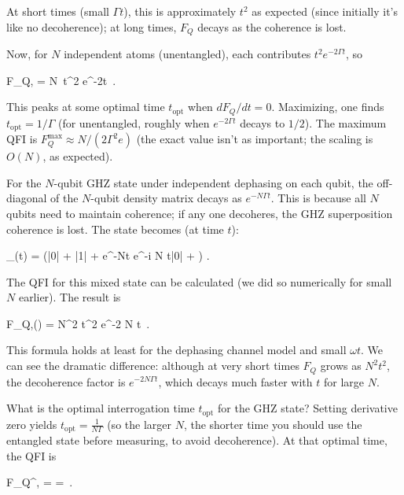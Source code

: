 At short times (small $\Gamma t$), this is approximately $t^2$ as expected (since initially it’s like no decoherence); at long times, $F_Q$ decays as the coherence is lost.



Now, for $N$ independent atoms (unentangled), each contributes $t^2 e^{-2\Gamma t}$, so

F_{Q,} = N\, t^2 e^{-2\Gamma t} \,.

This peaks at some optimal time $t_{\text{opt}}$ when $dF_Q/dt = 0$. Maximizing, one finds $t_{\text{opt}} = 1/\Gamma$ (for unentangled, roughly when $e^{-2\Gamma t}$ decays to $1/2$). The maximum QFI is $F_Q^{\max} \approx N/(2\Gamma^2 e)$ (the exact value isn’t as important; the scaling is $O(N)$, as expected).



For the $N$-qubit GHZ state under independent dephasing on each qubit,
the off-diagonal of the $N$-qubit density matrix decays as $e^{-N
  \Gamma t}$. This is because all $N$ qubits need to maintain
coherence; if any one decoheres, the GHZ superposition coherence is
lost. The state becomes (at time $t$):

\rho_{}(t) = \Big(|0\rangle{}| + |1\rangle{}| + e^{-N\Gamma t} e^{-i N \omega t}|0\rangle{}| + \Big) .

The QFI for this mixed state can be calculated (we did so numerically for small $N$ earlier). The result is

F_{Q,}(\omega) = N^2 t^2 e^{-2 N \Gamma t} \,.

This formula holds at least for the dephasing channel model and small $\omega t$. We can see the dramatic difference: although at very short times $F_Q$ grows as $N^2 t^2$, the decoherence factor is $e^{-2 N \Gamma t}$, which decays much faster with $t$ for large $N$.



What is the optimal interrogation time $t_{\text{opt}}$ for the GHZ
state? Setting derivative zero yields $t_{\text{opt}} = \frac{1}{N
  \Gamma}$ (so the larger $N$, the shorter time you should use the
entangled state before measuring, to avoid decoherence). At that
optimal time, the QFI is

F_Q^{\max,} \approx {} =
  =  \,.

